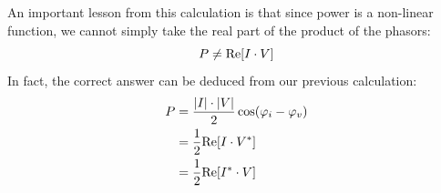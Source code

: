 \vspace{0.25cm}
\noindent
An important lesson from this calculation is that since power is a non-linear function, we cannot simply take the real part of the product of the phasors:
    \begin{equation}
        P \ne {\mathop{\rm Re}\nolimits} [I \cdot V]
    \end{equation}
In fact, the correct answer can be deduced from our previous calculation:
    \begin{align*}
        P &= \frac{{\left| I \right| \cdot \left| V \right|}}{2}\cos ({\varphi _i} - {\varphi _v})\\
        &= \frac{1}{2}{\mathop{\rm Re}\nolimits} [I \cdot {V^*}]\\
        &= \frac{1}{2}{\mathop{\rm Re}\nolimits} [{I^*} \cdot V]
    \end{align*}
